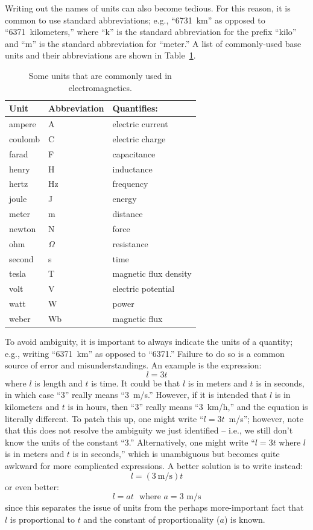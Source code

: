 Writing out the names of units can also become tedious.
For this reason, it is common to use standard abbreviations; e.g., ``6731~km'' as opposed to ``6371~kilometers,'' where ``k'' is the standard abbreviation for the prefix ``kilo'' and ``m'' is the standard abbreviation for ``meter.''
A list of commonly-used base units and their abbreviations are shown in Table~\ref{m0072_tUnits}.
%
\begin{table}
\begin{center}
\begin{tabular}{lll}
Unit & Abbreviation & Quantifies: \\
\hline
ampere & A & electric current \\
coulomb & C & electric charge\\
farad & F & capacitance \\
henry & H & inductance \\
hertz & Hz & frequency\\
joule & J & energy \\
meter & m & distance \\
newton & N & force \\
ohm & $\Omega$ & resistance\\
second & s & time\\
tesla & T & magnetic flux density \\
volt & V & electric potential\\
watt & W & power\\
weber & Wb & magnetic flux \\
\end{tabular}
\end{center}
\caption{Some units that are commonly used in electromagnetics.  
}
\label{m0072_tUnits}
\end{table}

To avoid ambiguity, it is important to always indicate the units of a quantity; e.g., writing ``6371~km'' as opposed to ``6371.''
Failure to do so is a common source of error and misunderstandings.  
An example is the expression: 
$$l = 3t$$ 
where $l$ is length and $t$ is time.  It could be that $l$ is in meters and $t$ is in seconds, in which case ``$3$'' really means ``3~m/s.''
However, if it is intended that $l$ is in kilometers and $t$ is in hours, then ``$3$'' really means ``3~km/h,'' and the equation is literally different.
To patch this up, one might write ``$l = 3t$~m/s''; however, note that this does not resolve the ambiguity we just identified -- i.e., we still don't know the units of the constant ``3.''
Alternatively, one might write ``$l=3t$ where $l$ is in meters and $t$ is in seconds,'' which is unambiguous but becomes quite awkward for more complicated expressions.
A better solution is to write instead:
$$l = \left(3~\mbox{m/s}\right)t$$
or even better:
$$l = at ~~~\mbox{where $a=3$~m/s}$$
since this separates the issue of units from the perhaps more-important fact that $l$ is proportional to $t$ and the constant of proportionality ($a$) is known.

